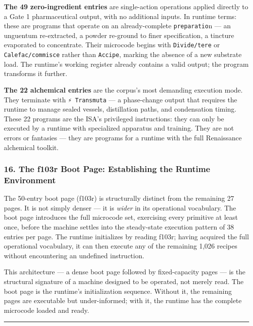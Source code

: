 \documentclass[12pt,a4paper]{article}
\begin{document}
\textbf{The 49 zero-ingredient entries} are single-action operations
applied directly to a Gate 1 pharmaceutical output, with no additional
inputs. In runtime terms: these are programs that operate on an
already-complete \texttt{preparatio}n --- an unguentum re-extracted, a
powder re-ground to finer specification, a tincture evaporated to
concentrate. Their microcode begins with \texttt{Divide/tere} or
\texttt{Calefac/commisce} rather than \texttt{Accipe}, marking the
absence of a new substrate load. The runtime's working register already
contains a valid output; the program transforms it further.

\textbf{The 22 alchemical entries} are the corpus's most demanding
execution mode. They terminate with \texttt{⚡\ Transmuta} --- a
phase-change output that requires the runtime to manage sealed vessels,
distillation paths, and condensation timing. These 22 programs are the
ISA's privileged instructions: they can only be executed by a runtime
with specialized apparatus and training. They are not errors or
fantasies --- they are programs for a runtime with the full Renaissance
alchemical toolkit.

\hypertarget{the-f103r-boot-page-establishing-the-runtime-environment}{%
\subsubsection{16. The f103r Boot Page: Establishing the Runtime
Environment}\label{the-f103r-boot-page-establishing-the-runtime-environment}}

The 50-entry boot page (f103r) is structurally distinct from the
remaining 27 pages. It is not simply denser --- it is \emph{wider} in
its operational vocabulary. The boot page introduces the full microcode
set, exercising every primitive at least once, before the machine
settles into the steady-state execution pattern of 38 entries per page.
The runtime initializes by reading f103r; having acquired the full
operational vocabulary, it can then execute any of the remaining 1,026
recipes without encountering an undefined instruction.

This architecture --- a dense boot page followed by fixed-capacity pages
--- is the structural signature of a machine designed to be operated,
not merely read. The boot page is the runtime's initialization sequence.
Without it, the remaining pages are executable but under-informed; with
it, the runtime has the complete microcode loaded and ready.

\begin{center}\rule{0.5\linewidth}{0.5pt}\end{center}
\end{document}
